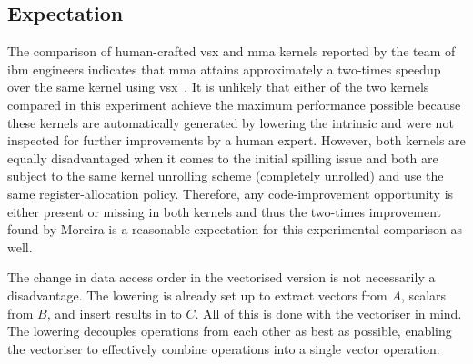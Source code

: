 \documentclass[\main/thesis.tex]{subfiles}
\begin{document}
\subsection{Expectation}
The comparison of human-crafted \gls{vsx} and \gls{mma} kernels reported by the team of \gls{ibm} engineers indicates that \gls{mma} attains approximately a two-times speedup over the same kernel using \gls{vsx}~\autocite{moreira2021matrix}.
It is unlikely that either of the two kernels compared in this experiment achieve the maximum performance possible because these kernels are automatically generated by \gls{lowering} the  intrinsic and were not inspected for further improvements by a human expert.
However, both kernels are equally disadvantaged when it comes to the initial spilling issue and both are subject to the same kernel unrolling scheme (\ie completely unrolled) and use the same register-allocation policy.
Therefore, any code-improvement opportunity is either present or missing in both kernels and thus the two-times improvement found by Moreira \etal is a reasonable expectation for this experimental comparison as well.

The change in data access order in the vectorised version is not necessarily a disadvantage.
The \gls{lowering} is already set up to extract vectors from $A$, scalars from $B$, and insert results in to $C$.
All of this is done with the vectoriser in mind.
The \gls{lowering} decouples operations from each other as best as possible, enabling the vectoriser to effectively combine operations into a single vector operation.
\end{document}
